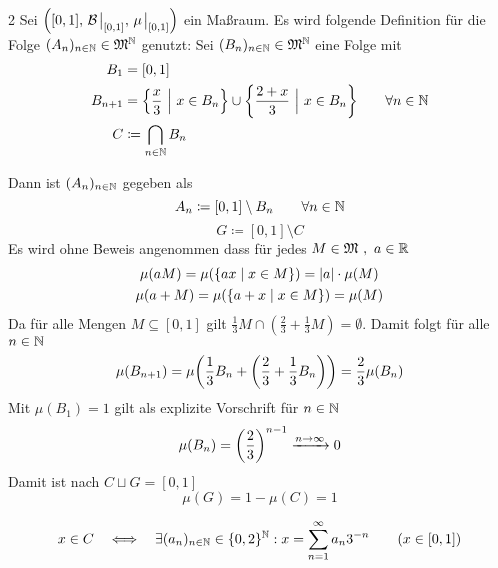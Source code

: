 \documentclass{anablatt}
\begin{document}
\makeheader
\setcounter{taski}2
\task
Sei $\qty([0,1],\, \mathcal B\eval_{[0,1]},\, \mu\eval_{[0,1]})$ ein Maßraum. Es wird folgende Definition für die Folge $(A_n)_{n\in\mathbb{N}} \in \mathfrak M^{\mathbb{N}}$ genutzt:
Sei $(B_n)_{n\in\mathbb{N}} \in \mathfrak M^{\mathbb{N}}$ eine Folge mit
\begin{align*}
    B_1 &= [0,1] \\
    B_{n+1} &= \qty{\frac x3 ~\Big\vert~ x \in B_n} \cup \qty{\frac{2+x}3 ~\Big\vert~ x \in B_n} \qquad \forall n \in \mathbb{N} \\
    C &\coloneqq \bigcap_{n\in\mathbb{N}} B_n 
\end{align*}

Dann ist $(A_n)_{n\in\mathbb{N}}$ gegeben als
\[ A_n \coloneqq [0,1] \setminus B_n \qquad \forall n\in\mathbb{N} \]
\[ G \coloneqq [0,1] \setminus C \]
Es wird ohne Beweis angenommen dass für jedes $M \in \mathfrak M ~,~ a \in \mathbb{R}$
\begin{gather*}
   \mu(aM) = \mu\qty(\qty{ax \mid x \in M}) = |a|\cdot\mu(M)  \\
   \mu(a+M) = \mu\qty(\qty{a+x \mid x \in M}) = \mu(M)  \\
\end{gather*}
\ttask
Da für alle Mengen $M \subseteq [0,1]$  gilt $\frac13 M \cap (\frac23+\frac13 M) = \emptyset$. Damit folgt für alle $n \in \mathbb{N}$
\[ \mu\qty(B_{n+1}) = \mu\qty(\frac13 B_n + \qty(\frac23+\frac13 B_n)) = \frac23 \mu(B_n) \]
Mit $\mu(B_1) = 1$ gilt als explizite Vorschrift für $n \in \mathbb{N}$
\[ \mu(B_n) = \qty(\frac23)^{n-1} \xrightarrow{n \rightarrow \infty} 0 \]
Damit ist nach $C \sqcup G = [0, 1]$
\[ \mu(G) = 1-\mu(C) = 1 \]
\ttask
\begin{theorem}
    \[ x \in C \quad\Longleftrightarrow\quad
    \exists (a_n)_{n\in\mathbb{N}} \in \{0,2\}^{\mathbb{N}} : x = \sum_{n=1}^\infty a_n3^{-n} \qquad (x \in [0,1]) \]
\end{theorem}
\newpage
\end{document}
